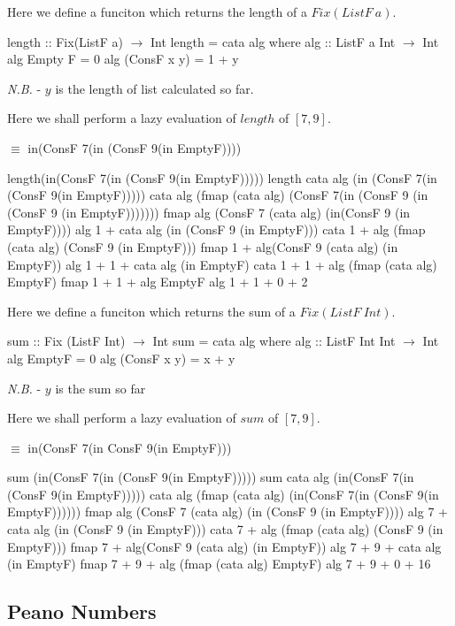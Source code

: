 \documentclass[11pt,a4paper]{article}
\begin{document}
Here we define a funciton which returns the length of a $Fix(ListF\ a)$.
\begin{code}
length :: Fix(ListF a) $\to$ Int
length = cata alg
  where
    alg :: ListF a Int $\to$ Int
    alg Empty F     = 0
    alg (ConsF x y) = 1 + y
\end{code}
\textit{N.B.} - $y$ is the length of list calculated so far.

Here we shall perform a lazy evaluation of $length$ of $[7,9]$.
\begin{code}
[7,9] $\equiv$ in(ConsF 7(in (ConsF 9(in EmptyF))))

length(in(ConsF 7(in (ConsF 9(in EmptyF)))))
{length}
cata alg (in (ConsF 7(in (ConsF 9(in EmptyF)))))
{cata}
alg (fmap (cata alg) (ConsF 7(in (ConsF 9 (in (ConsF 9 (in EmptyF)))))))
{fmap}
alg (ConsF 7 (cata alg) (in(ConsF 9 (in EmptyF))))
{alg}
1 + cata alg (in (ConsF 9 (in EmptyF)))
{cata}
1 + alg (fmap (cata alg) (ConsF 9 (in EmptyF)))
{fmap}
1 + alg(ConsF 9 (cata alg) (in EmptyF))
{alg}
1 + 1 + cata alg (in EmptyF)
{cata}
1 + 1 + alg (fmap (cata alg) EmptyF)
{fmap}
1 + 1 + alg EmptyF
{alg}
1 + 1 + 0
{+}
2
\end{code}

Here we define a funciton which returns the sum of a $Fix(ListF\ Int)$.
\begin{code}
sum :: Fix (ListF Int) $\to$ Int
sum = cata alg
  where
    alg :: ListF Int Int $\to$ Int
    alg EmptyF      = 0
    alg (ConsF x y) = x + y
\end{code}
\textit{N.B.} - $y$ is the sum so far

Here we shall perform a lazy evaluation of $sum$ of $[7,9]$.
\begin{code}
[7,9] $\equiv$ in(ConsF 7(in ConsF 9(in EmptyF)))

sum (in(ConsF 7(in (ConsF 9(in EmptyF)))))
{sum}
cata alg (in(ConsF 7(in (ConsF 9(in EmptyF)))))
{cata}
alg (fmap (cata alg) (in(ConsF 7(in (ConsF 9(in EmptyF))))))
{fmap}
alg (ConsF 7 (cata alg) (in (ConsF 9 (in EmptyF))))
{alg}
7 + cata alg (in (ConsF 9 (in EmptyF)))
{cata}
7 + alg (fmap (cata alg) (ConsF 9 (in EmptyF)))
{fmap}
7 + alg(ConsF 9 (cata alg) (in EmptyF))
{alg}
7 + 9 + cata alg (in EmptyF)
{fmap}
7 + 9 + alg (fmap (cata alg) EmptyF)
{alg}
7 + 9 + 0
{+}
16
\end{code}

\subsection{Peano Numbers}
\end{document}
